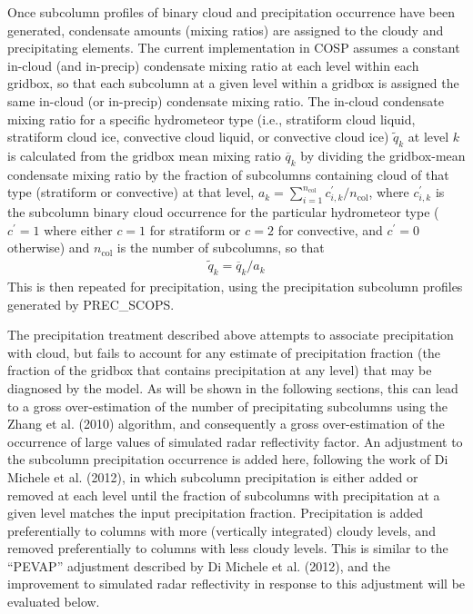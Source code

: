 Once subcolumn profiles of binary cloud and precipitation occurrence
have been generated, condensate amounts (mixing ratios) are assigned to
the cloudy and precipitating elements. The current implementation in
COSP assumes a constant in-cloud (and in-precip) condensate mixing ratio
at each level within each gridbox, so that each subcolumn at a given
level within a gridbox is assigned the same in-cloud (or in-precip)
condensate mixing ratio. The in-cloud condensate mixing ratio for a
specific hydrometeor type (i.e., stratiform cloud liquid, stratiform
cloud ice, convective cloud liquid, or convective cloud ice)
\(\tilde{q}_k\) at level \(k\) is calculated from the gridbox mean
mixing ratio \(\overline{q}_k\) by dividing the gridbox-mean condensate
mixing ratio by the fraction of subcolumns containing cloud of that type
(stratiform or convective) at that level,
\(a_k = \sum_{i = 1}^{n_\textrm{col}} c^\prime_{i, k} / n_\textrm{col}\),
where \(c^{\prime}_{i, k}\) is the subcolumn binary cloud occurrence for
the particular hydrometeor type (\(c^\prime = 1\) where either \(c = 1\)
for stratiform or \(c = 2\) for convective, and \(c^\prime = 0\)
otherwise) and \(n_\textrm{col}\) is the number of subcolumns, so that
\[\begin{gathered}
\tilde{q}_k = \overline{q}_k / a_k\end{gathered}\] This is then repeated
for precipitation, using the precipitation subcolumn profiles generated
by PREC\_SCOPS.

The precipitation treatment described above attempts to associate
precipitation with cloud, but fails to account for any estimate of
precipitation fraction (the fraction of the gridbox that contains
precipitation at any level) that may be diagnosed by the model. As will
be shown in the following sections, this can lead to a gross
over-estimation of the number of precipitating subcolumns using the
Zhang et al. (2010) algorithm, and consequently a gross over-estimation
of the occurrence of large values of simulated radar reflectivity
factor. An adjustment to the subcolumn precipitation occurrence is added
here, following the work of Di Michele et al. (2012), in which subcolumn
precipitation is either added or removed at each level until the
fraction of subcolumns with precipitation at a given level matches the
input precipitation fraction. Precipitation is added preferentially to
columns with more (vertically integrated) cloudy levels, and removed
preferentially to columns with less cloudy levels. This is similar to
the ``PEVAP'' adjustment described by Di Michele et al. (2012), and the
improvement to simulated radar reflectivity in response to this
adjustment will be evaluated below.

